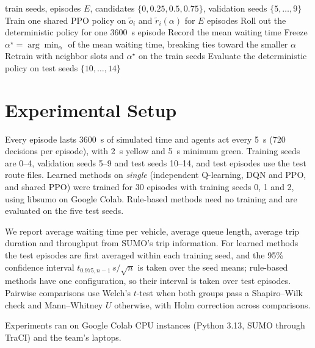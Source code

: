 \documentclass[conference]{IEEEtran}
\begin{document}
\begin{algorithm}[t]
\caption{Coordinated PPO. Each spatial-reward weight is trained with neighbor observations, scored on validation seeds 5--9, and the weight with the lowest mean waiting time is frozen before any test seed is used.}
\label{alg:coord}
\begin{algorithmic}[1]
\REQUIRE train seeds, episodes $E$, candidates $\{0, 0.25, 0.5, 0.75\}$, validation seeds $\{5,\ldots,9\}$
  \STATE Train one shared PPO policy on $\tilde{o}_i$ and $\tilde{r}_i(\alpha)$ for $E$ episodes
    \STATE Roll out the deterministic policy for one 3600~s episode
    \STATE Record the mean waiting time
  \ENDFOR
\ENDFOR
\STATE Freeze $\alpha^{\star} = \arg\min_\alpha$ of the mean waiting time, breaking ties toward the smaller $\alpha$
\STATE Retrain with neighbor slots and $\alpha^{\star}$ on the train seeds
\STATE Evaluate the deterministic policy on test seeds $\{10,\ldots,14\}$
\end{algorithmic}
\end{algorithm}

\section{Experimental Setup}
\label{sec:setup}
Every episode lasts 3600~s of simulated time and agents act every 5~s (720 decisions per episode), with 2~s yellow and 5~s minimum green. Training seeds are 0--4, validation seeds 5--9 and test seeds 10--14, and test episodes use the test route files. Learned methods on \emph{single} (independent Q-learning, DQN and PPO, and shared PPO) were trained for 30 episodes with training seeds 0, 1 and 2, using libsumo on Google Colab. Rule-based methods need no training and are evaluated on the five test seeds.

We report average waiting time per vehicle, average queue length, average trip duration and throughput from SUMO's trip information. For learned methods the test episodes are first averaged within each training seed, and the 95\% confidence interval $t_{0.975,n-1}\,s/\sqrt{n}$ is taken over the seed means; rule-based methods have one configuration, so their interval is taken over test episodes. Pairwise comparisons use Welch's $t$-test when both groups pass a Shapiro--Wilk check and Mann--Whitney $U$ otherwise, with Holm correction across comparisons.

Experiments ran on Google Colab CPU instances (Python 3.13, SUMO through TraCI) and the team's laptops.
\end{document}
